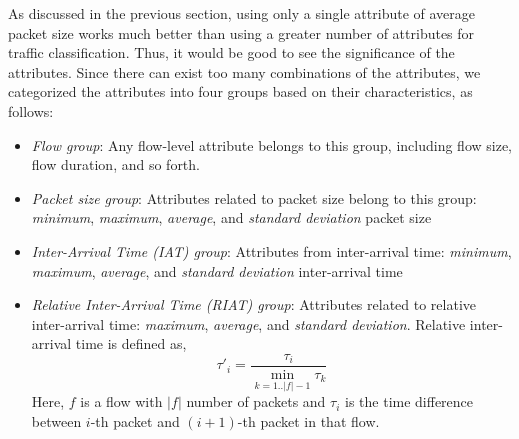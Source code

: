 \documentclass[conference]{IEEEtran}
\begin{document}

As discussed in the previous section, using only a single attribute of average packet size works much better than using a greater number of attributes for traffic classification.
Thus, it would be good to see the significance of the attributes.
Since there can exist too many combinations of the attributes, we categorized the attributes into four groups based on their characteristics, as follows:

\begin{itemize} \itemsep3pt \parskip3pt 
	\item \emph{Flow group}: Any flow-level attribute belongs to this group, including flow size, flow duration, and so forth.
	\item \emph{Packet size group}: Attributes related to packet size belong to this group: \emph{minimum}, \emph{maximum}, \emph{average}, and \emph{standard deviation} packet size
	\item \emph{Inter-Arrival Time (IAT) group}: Attributes from inter-arrival time: \emph{minimum}, \emph{maximum}, \emph{average}, and \emph{standard deviation} inter-arrival time
\item \emph{Relative Inter-Arrival Time (RIAT) group}: Attributes related to relative inter-arrival time: \emph{maximum}, \emph{average}, and \emph{standard deviation}. Relative inter-arrival time is defined as,
	$$\tau'_i = \frac{\tau_i}{\displaystyle \min_{k=1..|f|-1}{\tau_k}}$$
	Here, $f$ is a flow with $|f|$ number of packets and $\tau_i$ is the time difference between $i$-th packet and $(i+1)$-th packet in that flow.
\end{itemize}
\end{document}
